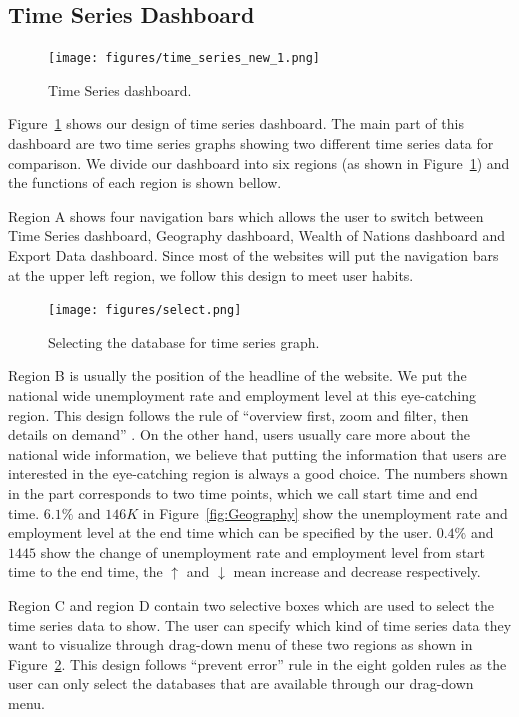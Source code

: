 \documentclass{sigchi}
\begin{document}
\subsection{Time Series Dashboard}
\begin{figure}[!htbp]
\centering
\texttt{[image: figures/time\_series\_new\_1.png]}
\caption{Time Series dashboard.}
\label{fig:time_series}
\end{figure}
Figure~\ref{fig:time_series} shows our design of time series dashboard. The main part of this dashboard are two time series graphs showing two different time series data for comparison. We divide our dashboard into six regions (as shown in Figure~\ref{fig:time_series}) and the functions of each region is shown bellow.

Region A shows four navigation bars which allows the user to switch between Time Series dashboard, Geography dashboard, Wealth of Nations dashboard and Export Data dashboard. Since most of the websites will put the navigation bars at the upper left region, we follow this design to meet user habits.

\begin{figure}[!htbp]
\centering
\texttt{[image: figures/select.png]}
\caption{Selecting the database for time series graph.}
\label{fig:select}
\end{figure}

Region B is usually the position of the headline of the website. We put the national wide unemployment rate and employment level at this eye-catching region. This design follows the rule of ``overview first, zoom and filter, then details on demand'' \cite{overview}. On the other hand, users usually care more about the national wide information, we believe that putting the information that users are interested in the eye-catching region is always a good choice. The numbers shown in the part corresponds to two time points, which we call start time and end time. $6.1\%$ and $146K$ in Figure~\ref{fig:Geography} show the unemployment rate and employment level at the end time which can be specified by the user. $0.4\%$ and $1445$ show the change of unemployment rate and employment level from start time to the end time, the $\uparrow$ and $\downarrow$ mean increase and decrease respectively.

Region C and region D contain two selective boxes which are used to select the time series data to show. The user can specify which kind of time series data they want to visualize through drag-down menu of these two regions as shown in Figure~\ref{fig:select}. This design follows ``prevent error'' rule in the eight golden rules \cite{eight} as the user can only select the databases that are available through our drag-down menu.
\end{document}
